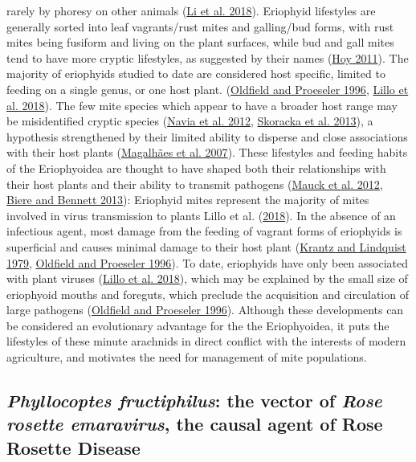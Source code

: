 \documentclass{ufdissertation}[overrideChapters] %
\begin{document}
{rarely by phoresy on other animals (\protect\hyperlink{ref-Li2018}{Li et al. 2018}). Eriophyid lifestyles are generally sorted into leaf vagrants/rust mites and galling/bud forms, with rust mites being fusiform and living on the plant surfaces, while bud and gall mites tend to have more cryptic lifestyles, as suggested by their names (\protect\hyperlink{ref-Hoy2011}{Hoy 2011}). The majority of eriophyids studied to date are considered host specific, limited to feeding on a single genus, or one host plant. (\protect\hyperlink{ref-Oldfield1996a}{Oldfield and Proeseler 1996}, \protect\hyperlink{ref-Lillo2018}{Lillo et al. 2018}). The few mite species which appear to have a broader host range may be misidentified cryptic species (\protect\hyperlink{ref-Navia2012}{Navia et al. 2012}, \protect\hyperlink{ref-Skoracka2013}{Skoracka et al. 2013}), a hypothesis strengthened by their limited ability to disperse and close associations with their host plants (\protect\hyperlink{ref-Magalhaes2007}{Magalhães et al. 2007}). These lifestyles and feeding habits of the Eriophyoidea are thought to have shaped both their relationships with their host plants and their ability to transmit pathogens (\protect\hyperlink{ref-Mauck2012}{Mauck et al. 2012}, \protect\hyperlink{ref-Biere2013}{Biere and Bennett 2013}): Eriophyid mites represent the majority of mites involved in virus transmission to plants Lillo et al. (\protect\hyperlink{ref-Lillo2018}{2018}). In the absence of an infectious agent, most damage from the feeding of vagrant forms of eriophyids is superficial and causes minimal damage to their host plant (\protect\hyperlink{ref-Krantz1979}{Krantz and Lindquist 1979}, \protect\hyperlink{ref-Oldfield1996a}{Oldfield and Proeseler 1996}). To date, eriophyids have only been associated with plant viruses (\protect\hyperlink{ref-Lillo2018}{Lillo et al. 2018}), which may be explained by the small size of eriophyoid mouths and foreguts, which preclude the acquisition and circulation of large pathogens (\protect\hyperlink{ref-Oldfield1996a}{Oldfield and Proeseler 1996}). Although these developments can be considered an evolutionary advantage for the the Eriophyoidea, it puts the lifestyles of these minute arachnids in direct conflict with the interests of modern agriculture, and motivates the need for management of mite populations.

\hypertarget{phyllocoptes-fructiphilus-the-vector-of-rose-rosette-emaravirus-the-causal-agent-of-rose-rosette-disease}{%
\subsection{\texorpdfstring{\emph{Phyllocoptes fructiphilus}: the vector of \emph{Rose rosette emaravirus}, the causal agent of Rose Rosette Disease}{Phyllocoptes fructiphilus: the vector of Rose rosette emaravirus, the causal agent of Rose Rosette Disease}}\label{phyllocoptes-fructiphilus-the-vector-of-rose-rosette-emaravirus-the-causal-agent-of-rose-rosette-disease}}

}
\end{document}
